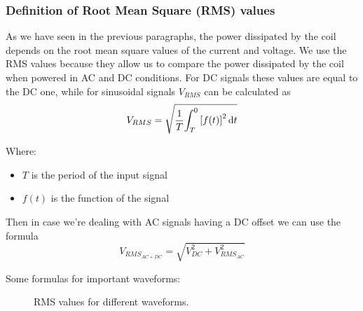 \subsubsection{Definition of Root Mean Square (RMS) values}
As we have seen in the previous paragraphs, the power dissipated by the coil depends on the root mean square values of the current and voltage.
We use the RMS values because they allow us to compare the power dissipated by the coil when powered in AC and DC conditions.
For DC signals these values are equal to the DC one, while for sinusoidal signals $V_{RMS}$ can be calculated as
\begin{equation}
    V_{RMS} = \sqrt{\frac{1}{T} {\int_{T}^{0} {[f(t)]}^2\, {\rm d}t}}
\end{equation}

Where:
\begin{itemize}
    \item \(T\) is the period of the input signal
    \item \(f(t)\) is the function of the signal 
\end{itemize}

Then in case we're dealing with AC signals having a DC offset we can use the formula
\begin{equation}
    V_{RMS_{AC+DC}} = \sqrt{V_{DC}^2 + V_{RMS_{AC}}^2}
\end{equation} 

Some formulas for important waveforms:
\begin{figure}
    \centering
    \resizebox{.9\linewidth}{!}{}
    \caption{RMS values for different waveforms.}
    \label{fig:RMS_table}
\end{figure}
